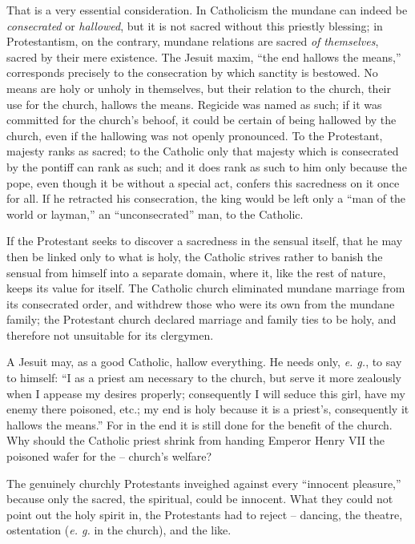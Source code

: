 \documentclass[12pt,a4paper]{book}
\begin{document}
That is a very essential consideration. In Catholicism the mundane can indeed 
be \textit{consecrated} or \textit{hallowed}, but it is not sacred without 
this priestly blessing; in Protestantism, on the contrary, mundane relations 
are sacred \textit{of themselves}, sacred by their mere existence. The Jesuit 
maxim, ``the end hallows the means,'' corresponds precisely to the 
consecration by which sanctity is bestowed. No means are holy or unholy in 
themselves, but their relation to the church, their use for the church, 
hallows the means. Regicide was named as such; if it was committed for the 
church's behoof, it could be certain of being hallowed by the church, even if 
the hallowing was not openly pronounced. To the Protestant, majesty ranks as 
sacred; to the Catholic only that majesty which is consecrated by the pontiff 
can rank as such; and it does rank as such to him only because the pope, even 
though it be without a special act, confers this sacredness on it once for 
all. If he retracted his consecration, the king would be left only a ``man of 
the world or layman,'' an ``unconsecrated'' man, to the Catholic.

If the Protestant seeks to discover a sacredness in the sensual itself, that 
he may then be linked only to what is holy, the Catholic strives rather to 
banish the sensual from himself into a separate domain, where it, like the 
rest of nature, keeps its value for itself. The Catholic church eliminated 
mundane marriage from its consecrated order, and withdrew those who were its 
own from the mundane family; the Protestant church declared marriage and 
family ties to be holy, and therefore not unsuitable for its clergymen.

A Jesuit may, as a good Catholic, hallow everything. He needs only, \textit{e. 
g.}, to say to himself: ``I as a priest am necessary to the church, but serve 
it more zealously when I appease my desires properly; consequently I will 
seduce this girl, have my enemy there poisoned, etc.; my end is holy because 
it is a priest's, consequently it hallows the means.'' For in the end it is 
still done for the benefit of the church. Why should the Catholic priest 
shrink from handing Emperor Henry VII the poisoned wafer for the -- church's 
welfare?

The genuinely churchly Protestants inveighed against every ``innocent 
pleasure,'' because only the sacred, the spiritual, could be innocent. What 
they could not point out the holy spirit in, the Protestants had to reject -- 
dancing, the theatre, ostentation (\textit{e. g.} in the church), and the 
like.
\end{document}
